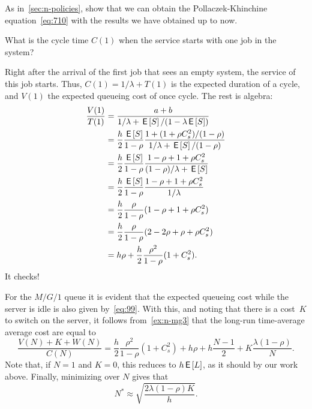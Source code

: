 \begin{exercise}
As in~\cref{sec:n-policies}, show that we can obtain the Pollaczek-Khinchine equation~\cref{eq:710} with the results we have obtained up to now. 
\begin{hint}
  What is the cycle time $C(1)$ when the service starts with one job in the system? 
\end{hint}
\begin{solution}
  Right after the arrival of the first job that sees an empty system, the service of this job starts.
  Thus, $C(1) = 1/\lambda + T(1)$ is the expected duration of a cycle, and $V(1)$ the expected queueing cost of once cycle.
  The rest is algebra:
  \begin{align*}
    \frac{V(1)}{T(1)}
    &= \frac{a + b}{1/\lambda + \,\mathsf{E}\left[S\right]/(1-\lambda \,\mathsf{E}\left[S\right])} \\
    &= \frac{h} 2 \frac{\,\mathsf{E}\left[S\right]}{1-\rho} \frac{1 + (1+\rho C_s^2 )/(1-\rho)}{1/\lambda + \,\mathsf{E}\left[S\right] /(1-\rho)} \\
    &= \frac{h} 2 \frac{\,\mathsf{E}\left[S\right]}{1-\rho} \frac{1-\rho + 1 +\rho C_s^2}{(1-\rho)/\lambda + \,\mathsf{E}\left[S\right]} \\
    &= \frac{h} 2 \frac{\,\mathsf{E}\left[S\right]}{1-\rho} \frac{1-\rho + 1 +\rho C_s^2}{1/\lambda } \\
    &= \frac{h} 2 \frac{\rho}{1-\rho} (1-\rho + 1 +\rho C_s^2) \\
    &= \frac{h} 2 \frac{\rho}{1-\rho} (2-2\rho + \rho +\rho C_s^2) \\
    &= h \rho + \frac h 2 \frac{\rho^2}{1-\rho} (1+ C_s^2).
  \end{align*}
It checks!  
\end{solution}
\end{exercise}

For the $M/G/1$ queue it is evident that the expected queueing cost while the server is idle is also given by~\cref{eq:99}.
With this, and noting that there is a cost~$K$ to switch on the server, it follows from~\cref{ex:n-mg3} that the long-run time-average average cost are equal to
\begin{equation}
  \label{eq:100}
    \frac{V(N) + K + W(N)}{C(N)}
    = \frac h 2 \frac{\rho^2}{1-\rho} (1+ C_s^2) + h \rho + h \frac{N-1}2 + K \frac{\lambda(1-\rho)}N.
\end{equation}
Note that, if $N=1$ and $K=0$, this reduces to $h \,\mathsf{E}\left[L\right]$, as it should by our work above.
Finally, minimizing over $N$ gives that
\begin{equation*}
  N^* \approx \sqrt{\frac{2\lambda(1-\rho)K}{h}}.
\end{equation*}

